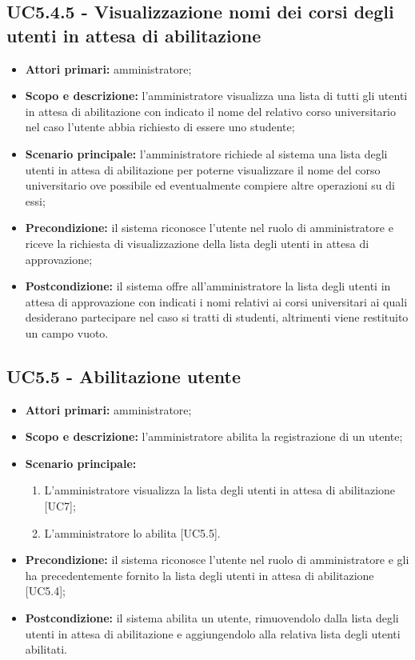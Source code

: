 \documentclass[AnalisiDeiRequisiti.tex]{subfiles}
\begin{document}
\subsection{UC5.4.5 - Visualizzazione nomi dei corsi degli utenti in attesa di abilitazione}
\begin{itemize}
	\item \textbf{Attori primari:} amministratore;
	\item \textbf{Scopo e descrizione:} l'amministratore visualizza una lista di tutti gli utenti in attesa di abilitazione con indicato il nome del relativo corso universitario nel caso l'utente abbia richiesto di essere uno studente;
	\item \textbf{Scenario principale:} l'amministratore richiede al sistema una lista degli utenti in attesa di abilitazione per poterne visualizzare il nome del corso universitario ove possibile ed eventualmente compiere altre operazioni su di essi;
	\item \textbf{Precondizione:} il sistema riconosce l'utente nel ruolo di amministratore e riceve la richiesta di visualizzazione della lista degli utenti in attesa di approvazione;
	\item \textbf{Postcondizione:} il sistema offre all'amministratore la lista degli utenti in attesa di approvazione con indicati i nomi relativi ai corsi universitari ai quali desiderano partecipare nel caso si tratti di studenti, altrimenti viene restituito un campo vuoto.
\end{itemize}
\subsection{UC5.5 - Abilitazione utente}
\begin{itemize}
	\item \textbf{Attori primari:} amministratore;
	\item \textbf{Scopo e descrizione:} l'amministratore abilita la registrazione di un utente;
	\item \textbf{Scenario principale:}
	\begin{enumerate}
		\item L'amministratore visualizza la lista degli utenti in attesa di abilitazione [UC7];
		\item L'amministratore lo abilita [UC5.5].
	\end{enumerate}
	\item \textbf{Precondizione:} il sistema riconosce l'utente nel ruolo di amministratore e gli ha precedentemente fornito la lista degli utenti in attesa di abilitazione [UC5.4];
	\item \textbf{Postcondizione:} il sistema abilita un utente, rimuovendolo dalla lista degli utenti in attesa di abilitazione e aggiungendolo alla relativa lista degli utenti abilitati.
\end{itemize}
\end{document}
